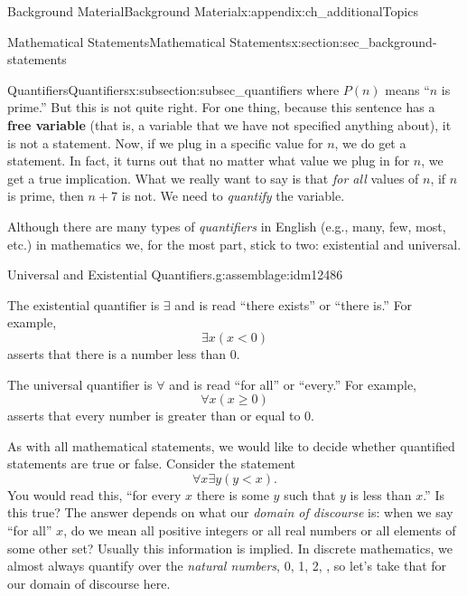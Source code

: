 \documentclass[oneside,10pt,]{book}
\newcommand{\terminology}[1]{\textbf{#1}}
\numberwithin{equation}{chapter}
\newcommand{\lt}{<}
\begin{document}
\begin{appendixptx}{Background Material}{}{Background Material}{}{}{x:appendix:ch_additionalTopics}
\begin{sectionptx}{Mathematical Statements}{}{Mathematical Statements}{}{}{x:section:sec_background-statements}
\begin{subsectionptx}{Quantifiers}{}{Quantifiers}{}{}{x:subsection:subsec_quantifiers}
where \(P(n)\) means ``\(n\) is prime.'' But this is not quite right. For one thing, because this sentence has a \terminology{free variable} (that is, a variable that we have not specified anything about), it is not a statement. Now, if we plug in a specific value for \(n\), we do get a statement. In fact, it turns out that no matter what value we plug in for \(n\), we get a true implication. What we really want to say is that \emph{for all} values of \(n\), if \(n\) is prime, then \(n+7\) is not. We need to \emph{quantify} the variable.%
\par
Although there are many types of \emph{quantifiers} in English (e.g., many, few, most, etc.) in mathematics we, for the most part, stick to two: existential and universal.%
\begin{assemblage}{Universal and Existential Quantifiers.}{g:assemblage:idm12486}%
%
\par
The existential quantifier is \(\exists\) and is read ``there exists'' or ``there is.'' For example, \label{g:notation:idm12500}%
\begin{equation*}
\exists x (x \lt 0)
\end{equation*}
asserts that there is a number less than 0.%
\par
The universal quantifier is \(\forall\) and is read ``for all'' or ``every.'' For example,  \label{g:notation:idm12513}%
\begin{equation*}
\forall x (x \ge 0)
\end{equation*}
asserts that every number is greater than or equal to 0.%
\end{assemblage}
As with all mathematical statements, we would like to decide whether quantified statements are true or false. Consider the statement%
\begin{equation*}
\forall x \exists y (y \lt x).
\end{equation*}
You would read this, ``for every \(x\) there is some \(y\) such that \(y\) is less than \(x\).'' Is this true? The answer depends on what our \emph{domain of discourse} is: when we say ``for all'' \(x\), do we mean all positive integers or all real numbers or all elements of some other set? Usually this information is implied. In discrete mathematics, we almost always quantify over the \emph{natural numbers}, 0, 1, 2, \textellipsis{}, so let's take that for our domain of discourse here.%
\par

\end{subsectionptx}
\end{sectionptx}
\end{appendixptx}
\end{document}
